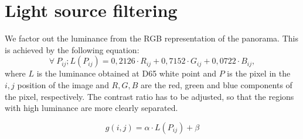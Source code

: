 \section{Light source filtering}
We factor out the luminance from the RGB representation of the panorama. This is achieved by the following equation:
\begin{equation}
  \forall \  P_{ij}; L(P_{ij}) = 0,2126 \cdot R_{ij} + 0,7152 \cdot G_{ij} + 0,0722 \cdot B_{ij} ,
\end{equation}
where $L$ is the luminance obtained at D65 white point and $P$ is the pixel in the $i,j$ position of the image and $R,G,B$ are the red, green and blue components of the pixel, respectively. \newline
The contrast ratio has to be adjusted, so that the regions with high luminance are more clearly separated.

\begin{equation}
     g(i,j) = \alpha \cdot L(P_{ij}) + \beta
\end{equation}

